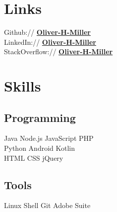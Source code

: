 \documentclass[letterpaper]{deedy-resume} %
\begin{document}
\begin{minipage}[t]{0.33\textwidth}

\sectionspace %


\section{Links} 

Github:// \href{https://github.com/Oliver-H-Miller}{\bf Oliver-H-Miller} \\
LinkedIn:// \href{https://www.linkedin.com/in/Oliver-H-Miller}{\bf Oliver-H-Miller} \\
StackOverflow:// \href{https://stackoverflow.com/users/3152313}{\bf Oliver-H-Miller} \\

\sectionspace %


\section{Skills}

\subsection{Programming}
Java \textbullet{} Node.js \textbullet{} JavaScript \textbullet{} PHP \\
Python \textbullet{} Android \textbullet{} Kotlin \\
HTML \textbullet{} CSS \textbullet{} jQuery \\

\sectionspace %

\subsection{Tools}
Linux \textbullet{} Shell \textbullet{} Git \textbullet{} Adobe Suite \\

\sectionspace %



\end{minipage}
\end{document}
